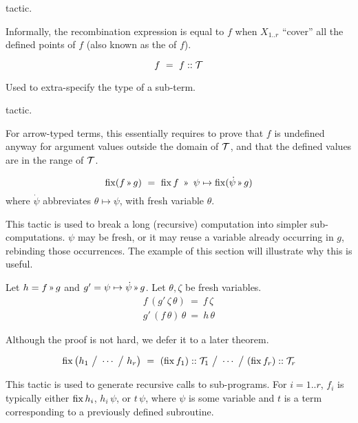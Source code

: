 \Obligations tactic.

Informally, the recombination expression is equal to $f$
when $X_{1..r}$ ``cover'' all the defined points of $f$ (also known as the  of $f$).

 \label{tactics:Shrink}
\[f ~=~ f :: \mathcal{T}\] 

Used to extra-specify the type of a sub-term.

\Obligations tactic.

For arrow-typed terms, this essentially requires to prove that $f$ is undefined anyway for
argument values outside the domain of $\mathcal{T}$, and that the defined values are in the range of $\mathcal{T}$.

 \label{tactics:Stratify}
\[\fix (f\applt g) ~=~ \fix f ~\applt~ \psi\mapsto \fix (\dot\psi\applt g)\]
%
where $\dot\psi$ abbreviates $\theta\mapsto\psi$, with fresh variable $\theta$.

This tactic is used to break a long (recursive) computation into simpler sub-computations.
$\psi$ may be fresh, or it may reuse a variable already occurring in $g$, rebinding those occurrences.
The example of this section will illustrate why this is useful.

\Obligations Let $h=f\applt g$ and $g'=\psi\mapsto\dot\psi\applt g$. Let $\theta,\zeta$ be
fresh variables.
\begin{equation}
\renewcommand\arraystretch{1.5}
\begin{array}{l}
f\,(g'\,\zeta\,\theta) ~=~ f\,\zeta \\
g'\,(f\,\theta)\,\theta ~=~ h\,\theta
\end{array}
\label{tactics:Stratify obligations}
\end{equation}

Although the proof is not hard, we defer it to a later theorem.

 \label{tactics:Synth}
\[\operatorname{fix}\big(h_1 ~\big/~ \cdots ~\big/~ h_r\big) ~=~ 
  (\operatorname{fix} f_1) :: \mathcal{T}_1 ~\big/~ \cdots ~\big/~ (\operatorname{fix} f_r) :: \mathcal{T}_r\]

This tactic is used to generate recursive calls to sub-programs. For $i=1..r$, $f_i$
is typically either $\operatorname{fix} h_i$, $h_i\,\psi$, or $t\,\psi$, where $\psi$ is some
variable and $t$ is a term corresponding to a previously defined subroutine.

\newcommand\Y{\mathcal{Y}}

